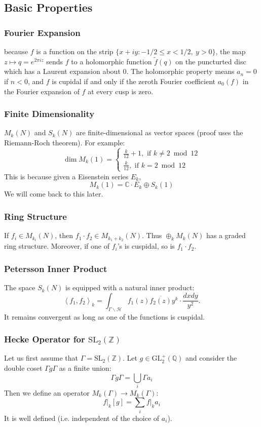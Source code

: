 \documentclass[11pt,english]{smfart}
\theoremstyle{definition}
\theoremstyle{remark}
\renewcommand{\tilde}{\widetilde}
\begin{document}
\subsection{Basic Properties}
\subsubsection{Fourier Expansion}
because $f$ is a function on the strip $\{x+iy:-1/2 \leq x< 1/2,\ y>0\}$, the map $z\mapsto q=e^{2\pi iz}$ sends $f$ to a holomorphic function $\tilde{f}(q)$ on the puncturted disc which has a Laurent expansion about $0$.
The holomorphic property means $a_n=0$ if $n<0$, and $f$ is cupidal if and only if the zeroth Fourier coefficient $a_0(f)$ in the Fourier expansion of $f$ at
every cusp is zero.
\subsubsection{Finite Dimensionality} 
$M_k(N)$ and $S_k(N)$ are finite-dimensional as vector spaces (proof uses the Riemann-Roch theorem). For example:
\[\operatorname{dim} M_{k}(1)=\left\{\begin{array}{l}
\frac{k}{12}+1, \text { if } k \neq 2 \bmod 12 \\
\frac{k}{12}, \text { if } k=2 \bmod 12
\end{array}\right.\]
This is because given a Eisenstein series $E_k$,
\[M_k(1)=\mathbb{C}\cdot  E_k \oplus S_k(1)\]
We will come back to this later.
\subsubsection{Ring Structure}
If $ f_{i} \in M_{k_{i}}(N) $, then $ f_{1} \cdot f_{2} \in   M_{k_{1}+k_{2}}(N) $. Thus $ \oplus_{k} M_{k}(N) $ has a graded ring structure. Moreover, if one of $ f_{i}  $'s is cuspidal, so is $ f_{1} \cdot f_{2} $.
\subsubsection{Petersson Inner Product}
The space $ S_{k}(N) $ is equipped with a natural inner product:
\[\left\langle f_{1}, f_{2}\right\rangle_{k}=\int_{\Gamma \backslash \mathcal{H}} f_{1}(z) \overline{f_{2}(z)} y^{k} \cdot \frac{d x d y}{y^{2}} .\]
It remains convergent as long as one of the functions is cuspidal.
\subsubsection{Hecke Operator for $\mathrm{SL_2}(\mathbb{Z})$}
Let us first assume that $\Gamma=\mathrm{SL_2}(\mathbb{Z})$. Let $g\in \mathrm{GL}_2^{+}(\mathbb{Q})$ and consider the double coset $\Gamma g \Gamma$ as a finite union:
\[\Gamma g \Gamma=\bigcup_i \Gamma a_i\]
Then we define an operator $M_k(\Gamma) \rightarrow M_k(\Gamma)$:
\[\left.f\right|_{k} [g] =\sum_i \left.f\right|_{k} a_i\]
It is well defined (i.e. independent of the choice of $a_i$).
\end{document}
